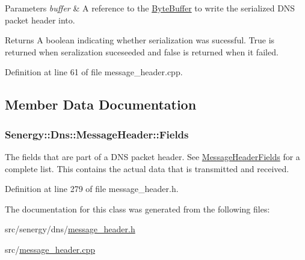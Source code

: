 \begin{DoxyParams}{Parameters}
{\em buffer} & A reference to the \hyperlink{class_senergy_1_1_byte_buffer}{Byte\-Buffer} to write the serialized D\-N\-S packet header into.\\
\hline
\end{DoxyParams}
\begin{DoxyReturn}{Returns}
A boolean indicating whether serialization was sucessful. True is returned when seralization suceseeded and false is returned when it failed. 
\end{DoxyReturn}


Definition at line 61 of file message\-\_\-header.\-cpp.



\subsection{Member Data Documentation}
\hypertarget{class_senergy_1_1_dns_1_1_message_header_a014c173ce2b2c5bb06ae9e5d0e201159}{
\subsubsection[{Fields}]{ Senergy\-::\-Dns\-::\-Message\-Header\-::\-Fields}}\label{class_senergy_1_1_dns_1_1_message_header_a014c173ce2b2c5bb06ae9e5d0e201159}


The fields that are part of a D\-N\-S packet header. See \hyperlink{struct_senergy_1_1_dns_1_1_message_header_fields}{Message\-Header\-Fields} for a complete list. This contains the actual data that is transmitted and received. 



Definition at line 279 of file message\-\_\-header.\-h.



The documentation for this class was generated from the following files\-:\begin{DoxyCompactItemize}
\item 
src/senergy/dns/\hyperlink{message__header_8h}{message\-\_\-header.\-h}\item 
src/\hyperlink{message__header_8cpp}{message\-\_\-header.\-cpp}\end{DoxyCompactItemize}
